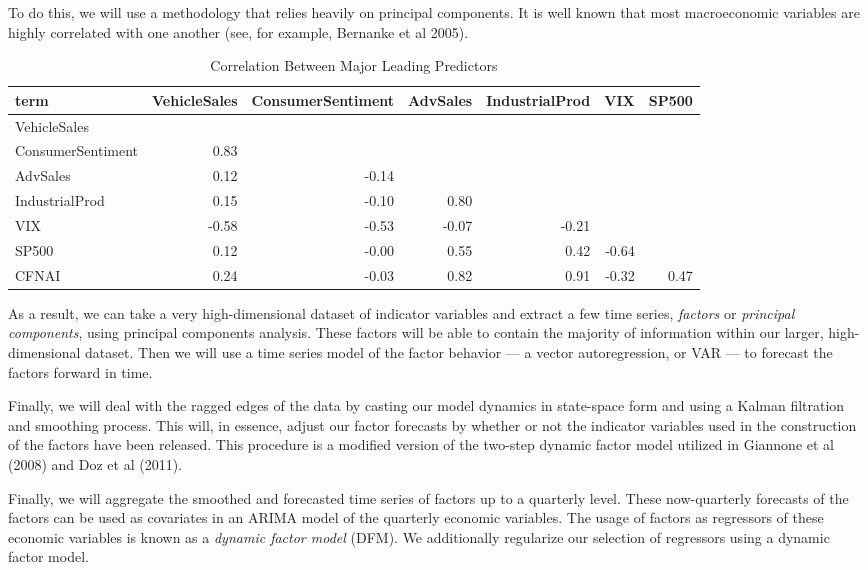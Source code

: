 \documentclass[11pt, letterpaper]{article}\usepackage[]{graphicx}\usepackage[]{color}
\begin{document}
To do this, we will use a methodology that relies heavily on principal components. It is well known that most macroeconomic variables are highly correlated with one another (see, for example, Bernanke et al 2005).
\begin{table}[H]
\centering
\begingroup\scriptsize
\begin{tabular}{lrrrrrr}
  \hline
term & VehicleSales & ConsumerSentiment & AdvSales & IndustrialProd & VIX & SP500 \\ 
  \hline
VehicleSales &  &  &  &  &  &  \\ 
  ConsumerSentiment & 0.83 &  &  &  &  &  \\ 
  AdvSales & 0.12 & -0.14 &  &  &  &  \\ 
  IndustrialProd & 0.15 & -0.10 & 0.80 &  &  &  \\ 
  VIX & -0.58 & -0.53 & -0.07 & -0.21 &  &  \\ 
  SP500 & 0.12 & -0.00 & 0.55 & 0.42 & -0.64 &  \\ 
  CFNAI & 0.24 & -0.03 & 0.82 & 0.91 & -0.32 & 0.47 \\ 
   \hline
\end{tabular}
\endgroup
\caption{Correlation Between Major Leading Predictors} 
\end{table}

As a result, we can take a very high-dimensional dataset of indicator variables and extract a few time series, \textit{factors} or \textit{principal components}, using principal components analysis. These factors will be able to contain the majority of information within our larger, high-dimensional dataset. Then we will use a time series model of the factor behavior --- a vector autoregression, or VAR --- to forecast the factors forward in time. 

Finally, we will deal with the ragged edges of the data by casting our model dynamics in state-space form and using a Kalman filtration and smoothing process. This will, in essence, adjust our factor forecasts by whether or not the indicator variables used in the construction of the factors have been released. This procedure is a modified version of the two-step dynamic factor model utilized in Giannone et al (2008) and Doz et al (2011).

Finally, we will aggregate the smoothed and forecasted time series of factors up to a quarterly level. These now-quarterly forecasts of the factors can be used as covariates in an ARIMA model of the quarterly economic variables. The usage of factors as regressors of these economic variables is known as a \textit{dynamic factor model} (DFM). We additionally regularize our selection of regressors using a dynamic factor model.
\end{document}
